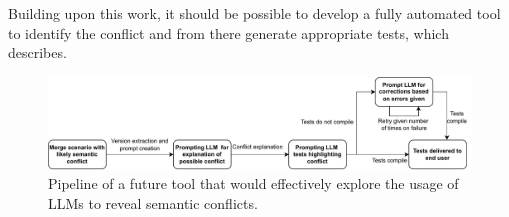 Building upon this work, it should be possible to develop a fully automated tool to identify the conflict and from there generate appropriate tests,
which  describes.
\begin{figure}
    \centering
    \includegraphics[width=1\linewidth]{figures/tool.pdf}
    \caption{Pipeline of a future tool that would effectively explore the usage
    of LLMs to reveal semantic conflicts.}
    \label{fig:tool}
\end{figure}